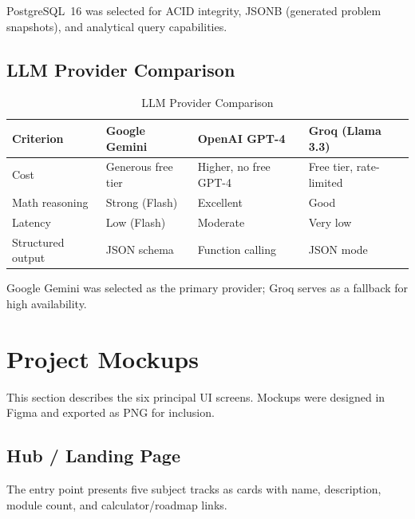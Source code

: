 PostgreSQL~16 was selected for ACID integrity, JSONB (generated problem snapshots), and analytical query capabilities.

\subsection{LLM Provider Comparison}
\label{subsec:llm-comparison}

\begin{table}[htbp]
\centering
\caption{LLM Provider Comparison}
\label{tab:llm-comparison}
\begin{tabular}{p{2.5cm}p{3.5cm}p{3.5cm}p{3.5cm}}
\toprule
\textbf{Criterion} & \textbf{Google Gemini} & \textbf{OpenAI GPT-4} & \textbf{Groq (Llama 3.3)} \\
\midrule
Cost & Generous free tier & Higher, no free GPT-4 & Free tier, rate-limited \\
Math reasoning & Strong (Flash) & Excellent & Good \\
Latency & Low (Flash) & Moderate & Very low \\
Structured output & JSON schema & Function calling & JSON mode \\
\bottomrule
\end{tabular}
\end{table}

Google Gemini was selected as the primary provider; Groq serves as a fallback for high availability.


\section{Project Mockups}
\label{sec:mockups}

This section describes the six principal UI screens. Mockups were designed in Figma and exported as PNG for inclusion.


\subsection{Hub / Landing Page} The entry point presents five subject tracks as cards with name, description, module count, and calculator/roadmap links.


